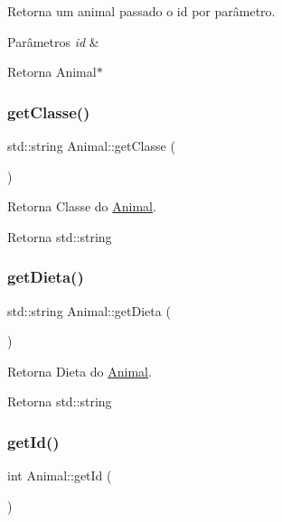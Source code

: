 Retorna um animal passado o id por parâmetro. 


\begin{DoxyParams}{Parâmetros}
{\em id} & \\
\hline
\end{DoxyParams}
\begin{DoxyReturn}{Retorna}
Animal$\ast$ 
\end{DoxyReturn}
\mbox{\label{classAnimal_a22e54ff48117237f9a201f5eca0eea81}} 
\subsubsection{\texorpdfstring{get\+Classe()}{getClasse()}}
{\footnotesize\ttfamily std\+::string Animal\+::get\+Classe (\begin{DoxyParamCaption}{ }\end{DoxyParamCaption})}



Retorna Classe do \hyperlink{classAnimal}{Animal}. 

\begin{DoxyReturn}{Retorna}
std\+::string 
\end{DoxyReturn}
\mbox{\label{classAnimal_a6fcb9a0b8debecb58ca20dbf88bce329}} 
\subsubsection{\texorpdfstring{get\+Dieta()}{getDieta()}}
{\footnotesize\ttfamily std\+::string Animal\+::get\+Dieta (\begin{DoxyParamCaption}{ }\end{DoxyParamCaption})}



Retorna Dieta do \hyperlink{classAnimal}{Animal}. 

\begin{DoxyReturn}{Retorna}
std\+::string 
\end{DoxyReturn}
\mbox{\label{classAnimal_a2c27e56355bc2b40d65250da2bb8a102}} 
\subsubsection{\texorpdfstring{get\+Id()}{getId()}}
{\footnotesize\ttfamily int Animal\+::get\+Id (\begin{DoxyParamCaption}{ }\end{DoxyParamCaption})}



